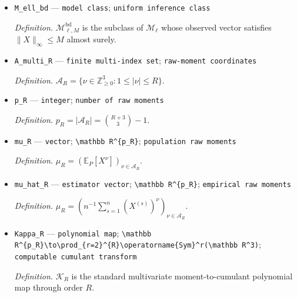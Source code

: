 \documentclass{article}
\begin{document}
\begin{itemize}
  \par\smallskip\noindent\emph{Definition.} \(M\) is a known coordinatewise envelope for the observed vector \(X\).
  \item \texttt{M\_\allowbreak{}ell\_\allowbreak{}bd} --- \texttt{model class}; \texttt{uniform inference class}
  \par\smallskip\noindent\emph{Definition.} \(\mathcal M^{\mathrm{bd}}_{\ell,M}\) is the subclass of \(\mathcal M_{\ell}\) whose observed vector satisfies \(\lVert X\rVert_{\infty}\le M\) almost surely.
  \item \texttt{A\_\allowbreak{}multi\_\allowbreak{}R} --- \texttt{finite multi-\allowbreak{}index set}; \texttt{raw-\allowbreak{}moment coordinates}
  \par\smallskip\noindent\emph{Definition.} \(\mathcal A_R=\{\nu\in\mathbb Z_{\ge0}^3:1\le|\nu|\le R\}\).
  \item \texttt{p\_\allowbreak{}R} --- \texttt{integer}; \texttt{number of raw moments}
  \par\smallskip\noindent\emph{Definition.} \(p_R=|\mathcal A_R|=\binom{R+3}{3}-1\).
  \item \texttt{mu\_\allowbreak{}R} --- \texttt{vector}; \texttt{\textbackslash{}\allowbreak{}mathbb R\textasciicircum{}\{p\_\allowbreak{}R\}\allowbreak{}}; \texttt{population raw moments}
  \par\smallskip\noindent\emph{Definition.} \(\mu_R=(\mathbb E_P[X^{\nu}])_{\nu\in\mathcal A_R}\).
  \item \texttt{mu\_\allowbreak{}hat\_\allowbreak{}R} --- \texttt{estimator vector}; \texttt{\textbackslash{}\allowbreak{}mathbb R\textasciicircum{}\{p\_\allowbreak{}R\}\allowbreak{}}; \texttt{empirical raw moments}
  \par\smallskip\noindent\emph{Definition.} \(\widehat\mu_R=(n^{-1}\sum_{s=1}^n (X^{(s)})^{\nu})_{\nu\in\mathcal A_R}\).
  \item \texttt{Kappa\_\allowbreak{}R} --- \texttt{polynomial map}; \texttt{\textbackslash{}\allowbreak{}mathbb R\textasciicircum{}\{p\_\allowbreak{}R\}\allowbreak{}\textbackslash{}\allowbreak{}to\textbackslash{}\allowbreak{}prod\_\allowbreak{}\{r=\allowbreak{}2\}\allowbreak{}\textasciicircum{}\{R\}\allowbreak{}\textbackslash{}\allowbreak{}operatorname\{Sym\}\allowbreak{}\textasciicircum{}r(\textbackslash{}\allowbreak{}mathbb R\textasciicircum{}3)}; \texttt{computable cumulant transform}
  \par\smallskip\noindent\emph{Definition.} \(\mathcal K_R\) is the standard multivariate moment-to-cumulant polynomial map through order \(R\).

\end{itemize}
\end{document}
